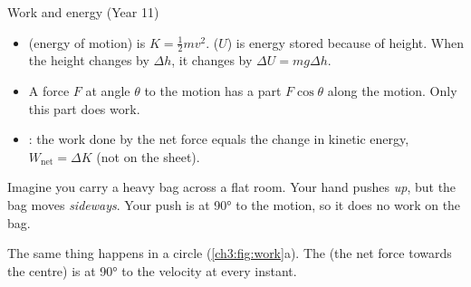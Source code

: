 \begin{keywords}
\end{keywords}

\begin{refresher}{Work and energy (Year 11)}
\begin{itemize}
  \item {} (energy of motion) is $K = \tfrac{1}{2}mv^2$.
         ($U$) is energy stored because of height. When the
        height changes by $\Delta h$, it changes by $\Delta U = mg\Delta h$.
  \item A force $F$ at angle $\theta$ to the motion has a part $F\cos\theta$ along the motion.
        Only this part does work.
  \item {}: the work done by the net force equals the change in
        kinetic energy, $W_\mathrm{net} = \Delta K$ (not on the sheet).
\end{itemize}
\end{refresher}

Imagine you carry a heavy bag across a flat room. Your hand pushes \emph{up}, but the bag moves
\emph{sideways}. Your push is at \ang{90} to the motion, so it does no work on the bag.

The same thing happens in a circle (\cref{ch3:fig:work}a). The  (the net
force towards the centre) is at \ang{90} to the velocity at every instant.


